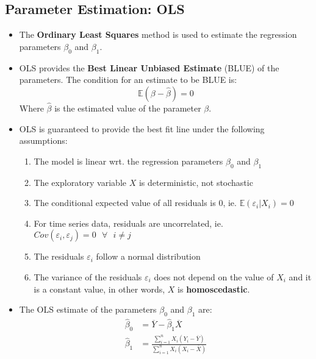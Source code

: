 \documentclass{article}
\theoremstyle{plain}
\theoremstyle{definition}
\begin{document}
\subsection{Parameter Estimation: OLS}
\begin{itemize}
    \item The \textbf{Ordinary Least Squares} method is used to estimate the regression parameters $\beta_0$ and $\beta_1$. 
    
    \item OLS provides the \textbf{Best Linear Unbiased Estimate} (BLUE) of the parameters. The condition for an estimate to be BLUE is:
    \begin{equation*}
        \mathbb{E}(\beta - \hat{\beta}) = 0
    \end{equation*}
    Where $\hat{\beta}$ is the estimated value of the parameter $\beta$.
    
    \item OLS is guaranteed to provide the best fit line under the following assumptions:
    \begin{enumerate}
        \item The model is linear wrt. the regression parameters $\beta_0$ and $\beta_1$
        
        \item The exploratory variable $X$ is deterministic, not stochastic
        
        \item The conditional expected value of all residuals is 0, ie. $\mathbb{E}(\varepsilon_i | X_i) = 0$
        
        \item For time series data, residuals are uncorrelated, ie. $Cov(\varepsilon_i, \varepsilon_j) = 0\text{ }\forall\text{ }i \ne j$
        
        \item The residuals $\varepsilon_i$ follow a normal distribution
        
        \item The variance of the residuals $\varepsilon_i$ does not depend on the value of $X_i$ and it is a constant value, in other words, $X$ is \textbf{homoscedastic}. 
    \end{enumerate}
    
     \item The OLS estimate of the parameters $\beta_0$ and $\beta_1$ are:
        \begin{align}
            \hat{\beta}_0 &= \overline{Y} - \hat{\beta}_1 \overline{X}\\
            \hat{\beta}_1 &= \frac{\sum\limits_{i=1}^{n} X_i (Y_i - \overline{Y})}{\sum\limits_{i=1}^{n} X_i (X_i - \overline{X})} 
        \end{align}
    

\end{itemize}
\end{document}
